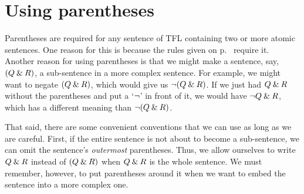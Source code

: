 


\section{Using parentheses}
\label{TFLconventions}

Parentheses are required for any sentence of TFL containing two or more atomic sentences. One reason for this is because the rules given on p.~\pageref{TFLsentences} require it. Another reason for using parentheses is that we might make a sentence, say, $(Q \mathbin{\&} R)$, a sub-sentence in a more complex sentence. For example, we might want to negate $(Q \mathbin{\&} R)$, which would give us ${\neg}(Q \mathbin{\&} R)$. If we just had $Q \mathbin{\&} R$ without the parentheses and put a `${\neg}$' in front of it, we would have ${\neg} Q \mathbin{\&} R$, which has a different meaning than ${\neg}(Q\mathbin{\&} R)$. 

That said, there are some convenient conventions that we can use as long as we are careful. First, if the entire sentence is not about to become a sub-sentence,  we can omit the sentence's \emph{outermost} parentheses. Thus, we allow ourselves to write $Q \mathbin{\&} R$ instead of $(Q \mathbin{\&} R)$ when $Q \mathbin{\&} R$ is the whole sentence. We must remember, however, to put parentheses around it when we want to embed the sentence into a more complex one.

